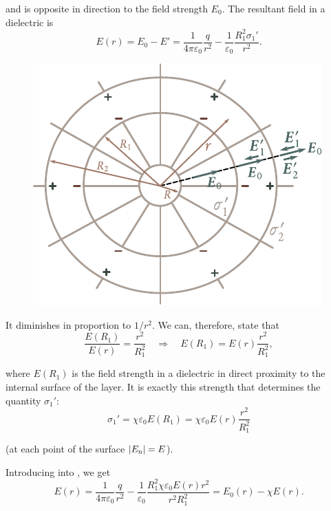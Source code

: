 \noindent
and is opposite in direction to the field strength $E_0$. The resultant field in a dielectric is
\begin{equation}\label{eq:2_39}
    E(r) = E_0 - E' = \frac{1}{4\pi\varepsilon_0} \frac{q}{r^2} - \frac{1}{\varepsilon_0} \frac{R_1^2 \sigma_1'}{r^2}.
\end{equation}

\begin{figure}[t]
	\begin{center}
		\includegraphics[scale=1.0]{figures/ch_02/fig_2_6.pdf}
		\caption[]{}
		\label{fig:2_6}
	\end{center}
	\vspace{-0.8cm}
\end{figure}

\noindent
It diminishes in proportion to $1/r^2$. We can, therefore, state that
\begin{equation*}
    \frac{E(R_1)}{E(r)} = \frac{r^2}{R_1^2}\quad \Rightarrow\quad E(R_1) = E(r) \frac{r^2}{R_1^2},
\end{equation*}

\noindent
where $E(R_1)$ is the field strength in a dielectric in direct proximity to the internal surface of the layer. It is exactly this strength that determines the quantity $\sigma_1'$:
\begin{equation}\label{eq:2_40}
    \sigma_1' = \chi\varepsilon_0 E(R_1) = \chi\varepsilon_0 E(r) \frac{r^2}{R_1^2}
\end{equation}

\noindent
(at each point of the surface $|E_{\text{n}}|=E$).

Introducing  into , we get
\begin{equation*}
    E(r) = \frac{1}{4\pi\varepsilon_0} \frac{q}{r^2} - \frac{1}{\varepsilon_0} \frac{R_1^2 \chi \varepsilon_0 E(r) r^2}{r^2 R_1^2} = E_0(r) - \chi E(r).
\end{equation*}

